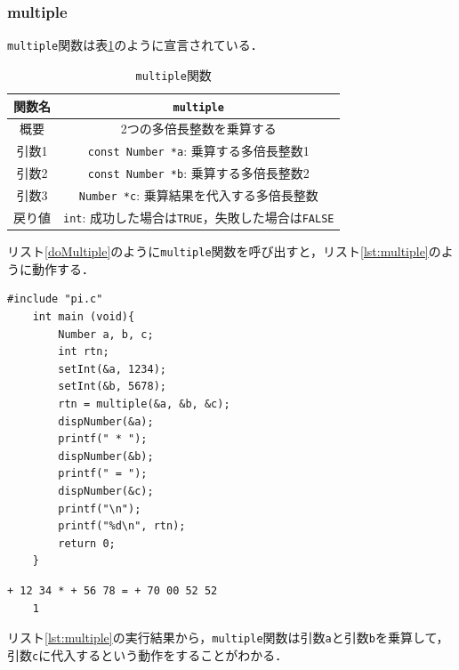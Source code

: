 \documentclass[a4paper,11pt,dvipdfmx]{jsarticle}
\begin{document}
\subsubsection{multiple}
\texttt{multiple}関数は表\ref{table:lst:multiple}のように宣言されている．

\begin{table}[H]
\centering
\caption{\texttt{multiple}関数}
\label{table:lst:multiple}
\begin{tabular}{c||c}
\hline
関数名    & \texttt{multiple}   \\
\hline
概要    & 2つの多倍長整数を乗算する   \\
\hline
引数1   & \texttt{const Number *a}: 乗算する多倍長整数1  \\
引数2   & \texttt{const Number *b}: 乗算する多倍長整数2  \\
引数3   & \texttt{Number *c}: 乗算結果を代入する多倍長整数  \\
\hline
戻り値    & \texttt{int}: 成功した場合は\texttt{TRUE}，失敗した場合は\texttt{FALSE}   \\
\hline
\end{tabular}
\end{table}

リスト\ref{doMultiple}のように\texttt{multiple}関数を呼び出すと，リスト\ref{lst:multiple}のように動作する．

\begin{lstlisting}[caption=\texttt{multiple}関数の呼び出し,label=doMultiple]
    #include "pi.c"
    int main (void){
        Number a, b, c;
        int rtn;
        setInt(&a, 1234);
        setInt(&b, 5678);
        rtn = multiple(&a, &b, &c);
        dispNumber(&a);
        printf(" * ");
        dispNumber(&b);
        printf(" = ");
        dispNumber(&c);
        printf("\n");
        printf("%d\n", rtn);
        return 0;
    }
\end{lstlisting}

\begin{lstlisting}[caption=リスト\ref{doMultiple}の実行結果,label=lst:multiple]
    + 12 34 * + 56 78 = + 70 00 52 52
    1
\end{lstlisting}

リスト\ref{lst:multiple}の実行結果から，\texttt{multiple}関数は引数\texttt{a}と引数\texttt{b}を乗算して，
引数\texttt{c}に代入するという動作をすることがわかる．
\end{document}
